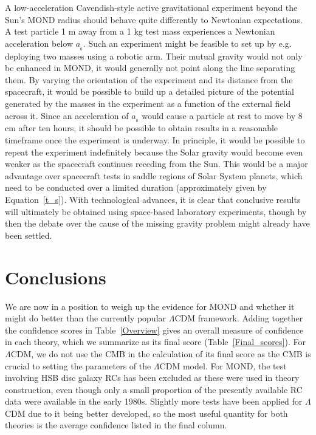 \documentclass[fleqn,usenatbib,useAMS,onecolumn]{mnras} %
\begin{document}
A low-acceleration Cavendish-style active gravitational experiment beyond the Sun's MOND radius should behave quite differently to Newtonian expectations. A test particle 1 m away from a 1 kg test mass experiences a Newtonian acceleration below $a_{_0}$. Such an experiment might be feasible to set up by e.g. deploying two masses using a robotic arm. Their mutual gravity would not only be enhanced in MOND, it would generally not point along the line separating them. By varying the orientation of the experiment and its distance from the spacecraft, it would be possible to build up a detailed picture of the potential generated by the masses in the experiment as a function of the external field across it. Since an acceleration of $a_{_0}$ would cause a particle at rest to move by 8 cm after ten hours, it should be possible to obtain results in a reasonable timeframe once the experiment is underway. In principle, it would be possible to repeat the experiment indefinitely because the Solar gravity would become even weaker as the spacecraft continues receding from the Sun. This would be a major advantage over spacecraft tests in saddle regions of Solar System planets, which need to be conducted over a limited duration (approximately given by Equation~\ref{t_s}). With technological advances, it is clear that conclusive results will ultimately be obtained using space-based laboratory experiments, though by then the debate over the cause of the missing gravity problem might already have been settled.





\section{Conclusions}
\label{Conclusions}

We are now in a position to weigh up the evidence for MOND and whether it might do better than the currently popular $\Lambda$CDM framework. Adding together the confidence scores in Table~\ref{Overview} gives an overall measure of confidence in each theory, which we summarize as its final score (Table~\ref{Final_scores}). For $\Lambda$CDM, we do not use the CMB in the calculation of its final score as the CMB is crucial to setting the parameters of the $\Lambda$CDM model. For MOND, the test involving HSB disc galaxy RCs has been excluded as these were used in theory construction, even though only a small proportion of the presently available RC data were available in the early 1980s. Slightly more tests have been applied for $\Lambda$CDM due to it being better developed, so the most useful quantity for both theories is the average confidence listed in the final column.
\end{document}
